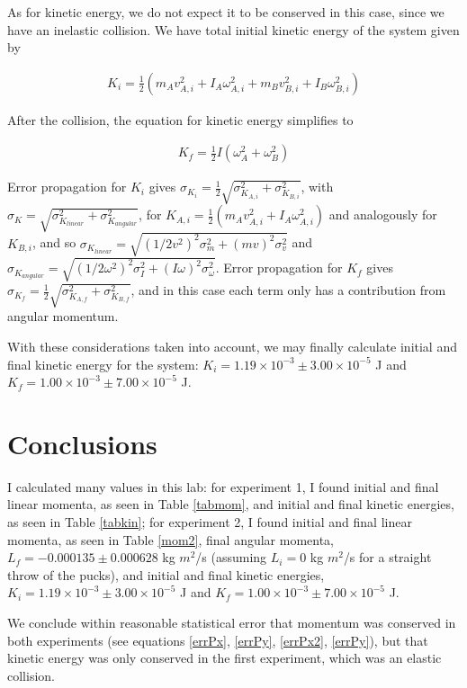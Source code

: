 \documentclass[11pt]{article}
\begin{document}
As for kinetic energy, we do not expect it to be conserved in this case, since we have an inelastic collision. We have total initial kinetic energy of the system given by 

\begin{align}
K_i = \frac{1}{2}(m_A v_{A,i}^2 + I_A \omega_{A,i}^2 + m_B v_{B,i}^2 +I_B \omega_{B,i}^2)
\end{align}

After the collision, the equation for kinetic energy simplifies to 

\begin{align}
K_f =\frac{1}{2}I(\omega_A^2+\omega_B^2)
\end{align}

Error propagation for $K_i$ gives $\sigma_{K_i} = \frac{1}{2}\sqrt{\sigma_{K_{A,i}}^2+\sigma_{K_{B,i}}^2}$, with $\sigma_K = \sqrt{\sigma_{K_{linear}}^2+\sigma_{K_{angular}}^2}$, for $K_{A,i}=\frac{1}{2}(m_A v_{A,i}^2+I_A \omega_{A,i}^2)$ and analogously for $K_{B,i}$, and so $\sigma_{K_{linear}}=\sqrt{(1/2v^2)^2\sigma_m^2+(mv)^2\sigma_v^2}$ and $\sigma_{K_{angular}}=\sqrt{(1/2\omega^2)^2\sigma_I^2+(I\omega)^2\sigma_{\omega}^2}$. Error propagation for $K_f$ gives $\sigma_{K_f}=\frac{1}{2}\sqrt{\sigma_{K_{A,f}}^2+\sigma_{K_{B,f}}^2}$, and in this case each term only has a contribution from angular momentum.

With these considerations taken into account, we may finally calculate initial and final kinetic energy for the system: $K_i = 1.19\times10^{-3} \pm3.00\times10^{-5}$ J and $K_f = 1.00\times10^{-3} \pm7.00\times10^{-5}$ J. 


\section{Conclusions}

I calculated many values in this lab: for experiment 1, I found initial and final linear momenta, as seen in Table \ref{tabmom}, and initial and final kinetic energies, as seen in Table \ref{tabkin}; for experiment 2, I found initial and final linear momenta, as seen in Table \ref{mom2}, final angular momenta, $L_f = -0.000135\pm 0.000628$ kg $m^2$/s (assuming $L_i=0$ kg $m^2$/s for a straight throw of the pucks), and initial and final kinetic energies, $K_i = 1.19\times10^{-3} \pm3.00\times10^{-5}$ J and $K_f = 1.00\times10^{-3} \pm7.00\times10^{-5}$ J. 


We conclude within reasonable statistical error that momentum was conserved in both experiments (see equations \ref{errPx}, \ref{errPy}, \ref{errPx2}, \ref{errPy}), but that kinetic energy was only conserved in the first experiment, which was an elastic collision.
\end{document}
